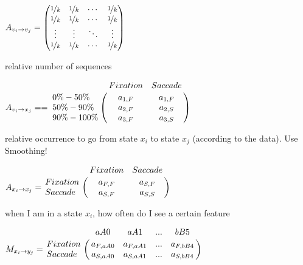 \documentclass[
        a4paper,     %
        titlepage,   %
        twoside,     %
        parskip      %
        ]{scrartcl} %
\begin{document}
\color{blue}
$
A_{v_i\rightarrow v_j} =
 \begin{pmatrix}
  \nicefrac{1}{k}  & \nicefrac{1}{k} & \cdots & \nicefrac{1}{k} \\
  \nicefrac{1}{k} & \nicefrac{1}{k} & \cdots & \nicefrac{1}{k} \\
  \vdots  & \vdots  & \ddots & \vdots  \\
  \nicefrac{1}{k} & \nicefrac{1}{k} & \cdots & \nicefrac{1}{k}
 \end{pmatrix}
$


\color{darkgreen}
relative number of sequences


$ 
A_{v_i\rightarrow x_j} = = \bordermatrix{
                  ~        & Fixation & Saccade \cr
                   0\%-50\%  & a_{1,F}   & a_{1,F} \cr
                  50\%-90\%  & a_{2,F}   & a_{2,S} \cr
                  90\%-100\% & a_{3,F}   & a_{3,S} \cr}
$


\color{orange}
relative occurrence to go from state $x_i$ to state $x_j$ (according to the data). 
Use Smoothing!


$ 
A_{x_i\rightarrow x_j} = \bordermatrix{
                  ~        & Fixation & Saccade \cr
                  Fixation & a_{F,F}   & a_{S,F} \cr
                  Saccade  & a_{S,F}   & a_{S,S} \cr}
$

\color{red}
when I am in a state $x_i$, how often do I see a certain feature

 
$ 
M_{x_i\rightarrow y_j} = \bordermatrix{
                  ~        & aA0 & aA1 & ... & bB5 \cr
                  Fixation & a_{F, aA0}   & a_{F, aA1}   & ... & a_{F, bB4} \cr
                  Saccade  & a_{S, aA0}   & a_{S, aA1}   & ... & a_{S, bB4} \cr}
$

\color{black}


    \clearpage %
    
\end{document}
